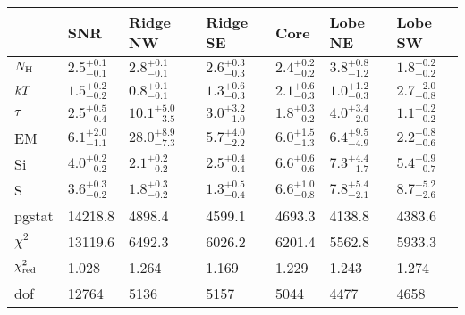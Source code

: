 \begin{tabular}{@{}lllllll@{}}
\toprule
 & SNR & Ridge NW & Ridge SE & Core & Lobe NE & Lobe SW \\
\midrule
$N_{\mathrm{H}}$ & ${2.5}^{+0.1}_{-0.1}$ & ${2.8}^{+0.1}_{-0.1}$ & ${2.6}^{+0.3}_{-0.3}$ & ${2.4}^{+0.2}_{-0.2}$ & ${3.8}^{+0.8}_{-1.2}$ & ${1.8}^{+0.2}_{-0.2}$ \\
$k T$ & ${1.5}^{+0.2}_{-0.2}$ & ${0.8}^{+0.1}_{-0.1}$ & ${1.3}^{+0.6}_{-0.3}$ & ${2.1}^{+0.6}_{-0.3}$ & ${1.0}^{+1.2}_{-0.3}$ & ${2.7}^{+2.0}_{-0.8}$ \\
$\tau$ & ${2.5}^{+0.5}_{-0.4}$ & ${10.1}^{+5.0}_{-3.5}$ & ${3.0}^{+3.2}_{-1.0}$ & ${1.8}^{+0.3}_{-0.2}$ & ${4.0}^{+3.4}_{-2.0}$ & ${1.1}^{+0.2}_{-0.2}$ \\
EM & ${6.1}^{+2.0}_{-1.1}$ & ${28.0}^{+8.9}_{-7.3}$ & ${5.7}^{+4.0}_{-2.2}$ & ${6.0}^{+1.5}_{-1.3}$ & ${6.4}^{+9.5}_{-4.9}$ & ${2.2}^{+0.8}_{-0.6}$ \\
Si & ${4.0}^{+0.2}_{-0.2}$ & ${2.1}^{+0.2}_{-0.2}$ & ${2.5}^{+0.4}_{-0.4}$ & ${6.6}^{+0.6}_{-0.6}$ & ${7.3}^{+4.4}_{-1.7}$ & ${5.4}^{+0.9}_{-0.7}$ \\
S & ${3.6}^{+0.3}_{-0.2}$ & ${1.8}^{+0.3}_{-0.2}$ & ${1.3}^{+0.5}_{-0.4}$ & ${6.6}^{+1.0}_{-0.8}$ & ${7.8}^{+5.4}_{-2.1}$ & ${8.7}^{+5.2}_{-2.6}$ \\
\midrule
pgstat & 14218.8 & 4898.4 & 4599.1 & 4693.3 & 4138.8 & 4383.6 \\
$\chi^2$ & 13119.6 & 6492.3 & 6026.2 & 6201.4 & 5562.8 & 5933.3 \\
$\chi^2_{\mathrm{red}}$ & 1.028 & 1.264 & 1.169 & 1.229 & 1.243 & 1.274 \\
dof & 12764 & 5136 & 5157 & 5044 & 4477 & 4658 \\
\bottomrule
\end{tabular}
